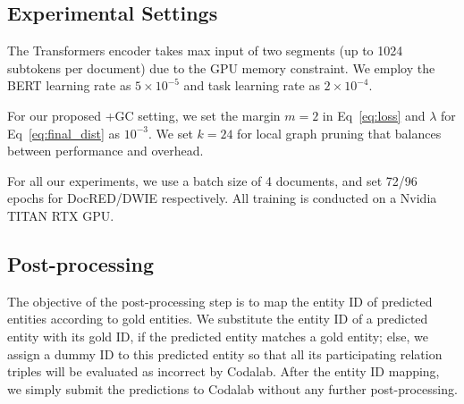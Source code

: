 \documentclass[11pt]{article}
\begin{document}
\begin{table}[tbp!]
\centering
{}
\caption{Statistics of the dataset DocRED and DWIE. TRN, DEV, TST are the numbers of documents in the training, development, and test set. \texttt{\#T} and \texttt{\#E} are the averaged numbers of tokens and entity clusters per document. \texttt{\%S} is the averaged percentage of singleton entities out of all entities per document.}
\label{tab:stats}
\end{table}


\subsection{Experimental Settings}
\label{appd:impl}

The Transformers encoder takes max input of two segments (up to 1024 subtokens per document) due to the GPU memory constraint. We employ the BERT learning rate as $5 \times 10^{-5}$ and task learning rate as $2 \times 10^{-4}$.

For our proposed +GC setting, we set the margin $m = 2$ in Eq~\eqref{eq:loss} and $\lambda$ for Eq~\eqref{eq:final_dist} as $10^{-3}$. We set $k = 24$ for local graph pruning that balances between performance and overhead.

For all our experiments, we use a batch size of 4 documents, and set 72/96 epochs for DocRED/DWIE respectively. All training is conducted on a Nvidia TITAN RTX GPU.

\subsection{Post-processing}
\label{appd:post}

The objective of the post-processing step is to map the entity ID of predicted entities according to gold entities. We substitute the entity ID of a predicted entity with its gold ID, if the predicted entity matches a gold entity; else, we assign a dummy ID to this predicted entity so that all its participating relation triples will be evaluated as incorrect by Codalab. After the entity ID mapping, we simply submit the predictions to Codalab without any further post-processing.
 
\end{document}
